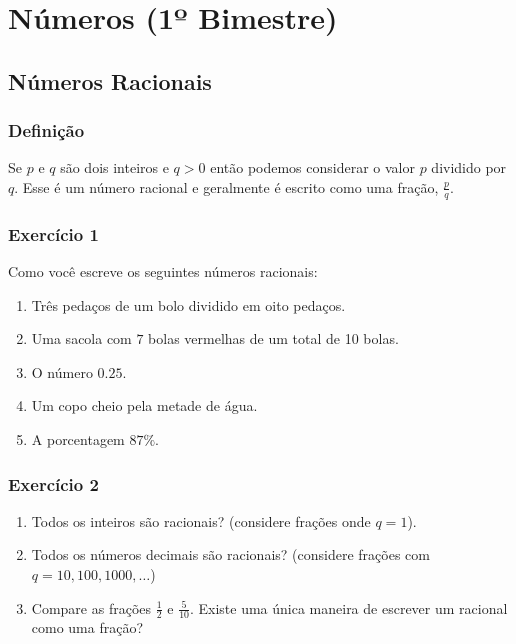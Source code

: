 \chapter{Números (1º Bimestre)}

\section{Números Racionais}

\subsection*{Definição}

Se $p$ e $q$ são dois inteiros e $q > 0$ então podemos considerar o valor $p$
dividido por $q$. Esse é um número racional e geralmente é escrito como uma
fração, $\frac{p}{q}$.

\subsection*{Exercício 1}

Como você escreve os seguintes números racionais:

\begin{enumerate}
\item Três pedaços de um bolo dividido em oito pedaços.
\item Uma sacola com $7$ bolas vermelhas de um total de 10 bolas.
\item O número $0.25$.
\item Um copo cheio pela metade de água.
\item A porcentagem $87\%$.
\end{enumerate}

\subsection*{Exercício 2}

\begin{enumerate}
\item Todos os inteiros são racionais? (considere frações onde $q = 1$).

\item Todos os números decimais são racionais? (considere frações com $q = 10,
  100, 1000, \ldots$)

\item Compare as frações $\frac{1}{2}$ e $\frac{5}{10}$. Existe uma única
  maneira de escrever um racional como uma fração?
\end{enumerate}

